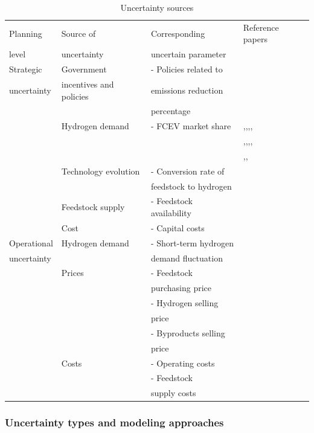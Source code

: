 \documentclass[11pt,3p]{elsarticle}
\begin{document}
\begin{table}[!htbp]
\centering
\caption{Uncertainty sources}
\label{tab:UncertaintySources}
\begin{tabular}{llll}
\hline
Planning & Source of & Corresponding & Reference papers \\
level & uncertainty & uncertain parameter &  \\ \hline
Strategic & Government &  - Policies related to &  \\
uncertainty & incentives and policies & emissions reduction &  \\
 &  & percentage &  \\
 & Hydrogen demand &  - FCEV market share & \citep{agnolucci2013importance},\citep{almansoori2012design},\citep{almaraz2014hydrogen},\citep{cho2016optimization},\citep{dayhim2014planning} \\
 &  &  & \citep{han2012modeling},\citep{hwangbo2017mathematical},\citep{kim2008strategic},\citep{kim2008optimization},\citep{konda2011optimal} \\
 &  &  & \citep{kim2016optimization},\citep{kim2017integrated},\citep{nunes2015design} \\
 & Technology evolution &  - Conversion rate of &  \\
 &  & feedstock to hydrogen&  \\
 & Feedstock supply &  - Feedstock availability&  \\
 & Cost &  - Capital costs &  \\
Operational & Hydrogen demand & - Short-term hydrogen &  \\
uncertainty &  & demand fluctuation &  \\
 & Prices &  - Feedstock &  \\
 &  & purchasing price &  \\
 &  &  - Hydrogen selling &  \\
 &  & price &  \\
 &  &  - Byproducts selling &  \\
 &  & price &  \\
 & Costs &  - Operating costs & \citep{sabio2010strategic} \\
 &  &  - Feedstock &  \\
 &  & supply costs &  \\ \hline
\end{tabular}
\end{table}

\subsubsection{Uncertainty types and modeling approaches}
\end{document}
